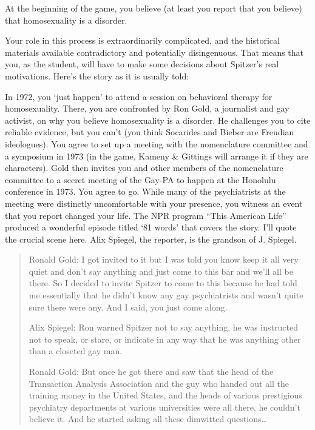 \begin{refsection}
At the beginning of the game, you believe (at least you report that you believe) that homosexuality is a disorder.

Your role in this process is extraordinarily complicated, and the historical materials available contradictory and potentially disingenuous. That means that you, as the student, will have to make some decisions about Spitzer's real motivations. Here's the story as it is usually told:

In 1972, you `just happen' to attend a session on behavioral therapy for homosexuality. There, you are confronted by Ron Gold, a journalist and gay activist, on why you believe homosexuality is a disorder. He challenges you to cite reliable evidence, but you can't (you think Socarides and Bieber are Freudian ideologues). You agree to set up a meeting with the nomenclature committee and a symposium in 1973 (in the game, Kameny \& Gittings will arrange it if they are characters). Gold then invites you and other members of the nomenclature committee to a secret meeting of the Gay-PA to happen at the Honolulu conference in 1973. You agree to go. While many of the psychiatrists at the meeting were distinctly uncomfortable with your presence, you witness an event that you report changed your life. The NPR program “This American Life” produced a wonderful episode titled `81 words' that covers the story. I'll quote the crucial scene here. Alix Spiegel, the reporter, is the grandson of J. Spiegel.

\begin{quote}

Ronald Gold: I got invited to it but I was told you know keep it all very quiet and don't say anything and just come to this bar and we'll all be there. So I decided to invite Spitzer to come to this because he had told me essentially that he didn't know any gay psychiatrists and wasn't quite sure there were any. And I said, you just come along.

Alix Spiegel: Ron warned Spitzer not to say anything, he was instructed not to speak, or stare, or indicate in any way that he was anything other than a closeted gay man.

Ronald Gold: But once he got there and saw that the head of the Transaction Analysis Association and the guy who handed out all the training money in the United States, and the heads of various prestigious psychiatry departments at various universities were all there, he couldn't believe it. And he started asking all these dimwitted questions{\ldots}


\end{quote}
\end{refsection}
